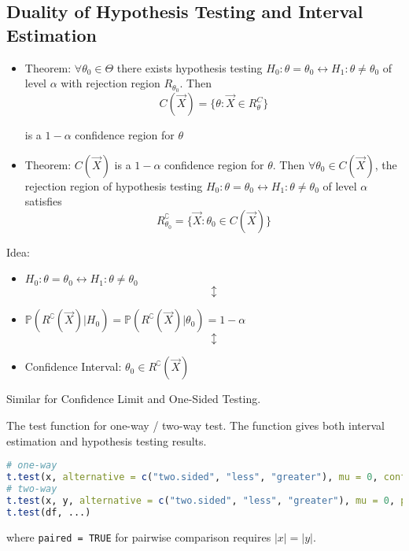 \subsection{Duality of Hypothesis Testing and Interval Estimation}

\begin{itemize}
    \item Theorem: $\forall\theta_0\in\Theta$ there exists hypothesis testing $H_0:\theta=\theta_0\longleftrightarrow H_1:\theta\neq\theta_0$ of level $\alpha$ with rejection region $R_{\theta_0}$. Then
    \begin{equation}
        C(\vec{X})=\{\theta:\vec{X}\in R^C_{\theta}\}
    \end{equation}

    is a $1-\alpha$ confidence region for $\theta$

    \item Theorem: $C(\vec{X})$ is a $1-\alpha$ confidence region for $\theta$. Then $\forall\theta_0\in C(\vec{X})$, the rejection region of hypothesis testing $H_0:\theta=\theta_0\longleftrightarrow H_1:\theta\neq\theta_0$ of level $\alpha$ satisfies
    \begin{equation}
    R^\complement_{\theta_0}=\{\vec{X}:\theta_0\in C(\vec{X})\}
    \end{equation}
\end{itemize}
    
    \begin{point}
        Idea:
    \end{point}
    
        
\begin{itemize}[itemsep=-3pt]
    \item[] \centering $H_0:\theta=\theta_0\longleftrightarrow H_1:\theta\neq\theta_0$
    \begin{equation*}\updownarrow\end{equation*}
    \item[] \centering $\mathbb{P}(R^\complement(\vec{X})|H_0)=\mathbb{P}(R^\complement(\vec{X})|\theta_0)=1-\alpha$
    \begin{equation*}\updownarrow\end{equation*}
    \item[] Confidence Interval: $\theta_0\in R^\complement(\vec{X})$
\end{itemize}

    Similar for Confidence Limit and One-Sided Testing.

\hypertarget{CODEttest}{}
\begin{rcode}
The test function for one-way / two-way test. The function gives both interval estimation and hypothesis testing results.
\begin{lstlisting}[language=R]
# one-way
t.test(x, alternative = c("two.sided", "less", "greater"), mu = 0, conf.level = 0.95, ...)
# two-way
t.test(x, y, alternative = c("two.sided", "less", "greater"), mu = 0, paired = FALSE, var.equal = FALSE, conf.level = 0.95, ...)
t.test(df, ...) 
\end{lstlisting}
where \lstinline|paired = TRUE| for pairwise comparison requires $ |x|=|y| $.
\end{rcode}


